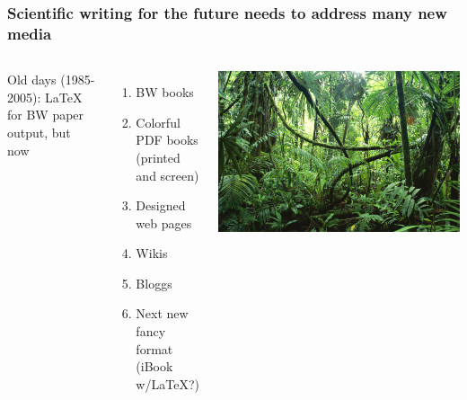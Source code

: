 \documentclass{beamer}
\begin{document}
\begin{frame}
\frametitle{Scientific writing for the future needs to address many new media}


\begin{columns}
Old days (1985-2005): {\LaTeX} for BW paper output, but now

\begin{enumerate}
  \item BW books

  \item Colorful PDF books (printed and screen)

  \item Designed web pages

  \item Wikis

  \item Bloggs

  \item Next new fancy format (iBook w/LaTeX?)
\end{enumerate}

\noindent

\begin{center}  %
  \centerline{\includegraphics[width=0.9\linewidth]{../doc/slides/fig/jungle_with_mess.jpg}}
\end{center}


\end{columns}
\end{frame}
\end{document}
